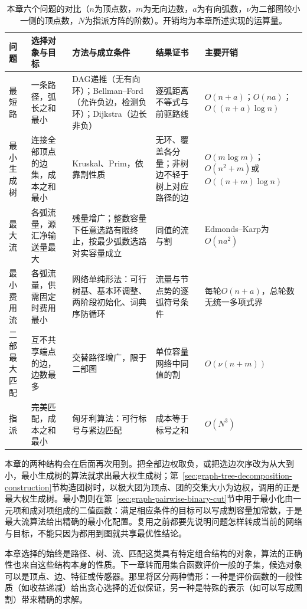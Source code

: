 \begin{table}[!htb]
  \centering\small
  \caption{本章六个问题的对比（$n$为顶点数，$m$为无向边数，$a$为有向弧数，$\nu$为二部图较小一侧的顶点数，$N$为指派方阵的阶数）。开销均为本章所述实现的运算量。}
  \label{tab:graph-opt-summary}
  \begin{tabularx}{\linewidth}{@{}l>{\raggedright\arraybackslash}X>{\raggedright\arraybackslash}X>{\raggedright\arraybackslash}X>{\raggedright\arraybackslash}p{30mm}@{}}
    \toprule
    问题 & 选择对象与目标 & 方法与成立条件 & 结果证书 & 主要开销\\
    \midrule
    最短路 & 一条路径，弧长之和最小 & DAG递推（无有向环）；Bellman--Ford（允许负边，检测负环）；Dijkstra（边长非负） & 逐弧距离不等式与前驱路线 & $O(n+a)$；$O(na)$；$O((n+a)\log n)$\\
    最小生成树 & 连接全部顶点的边集，成本之和最小 & Kruskal、Prim，依靠割性质 & 无环、覆盖各分量；非树边不轻于树上对应路径的边 & $O(m\log m)$；$O(n^2+m)$或$O((n+m)\log n)$\\
    最大流 & 各弧流量，源汇净输送量最大 & 残量增广；整数容量下任意选路有限终止，按最少弧数选路对实容量成立 & 同值的流与割 & Edmonds--Karp为$O(na^2)$\\
    最小费用流 & 各弧流量，供需固定时费用最小 & 网络单纯形法：可行树基、基本环调整、两阶段初始化、词典序防循环 & 流量与节点势的逐弧符号条件 & 每轮$O(n+a)$，总轮数无统一多项式界\\
    二部最大匹配 & 互不共享端点的边，边数最多 & 交替路径增广，限于二部图 & 单位容量网络中同值的割 & $O(\nu(n+m))$\\
    指派 & 完美匹配，成本之和最小 & 匈牙利算法：可行标号与紧边匹配 & 成本等于标号之和 & $O(N^3)$\\
    \bottomrule
  \end{tabularx}
\end{table}

本章的两种结构会在后面再次用到。把全部边权取负，或把选边次序改为从大到小，最小生成树的算法就求出最大权生成树；第~\ref{sec:graph-tree-decomposition-construction}节构造团树时，以极大团为顶点、团的交集大小为边权，调用的正是最大权生成树。最小割则在第~\ref{sec:graph-pairwise-binary-cut}节中用于最小化由一元项和成对项组成的二值函数：满足相应条件的目标可以写成割容量加常数，于是最大流算法给出精确的最小化配置。复用之前都要先说明问题怎样转成当前的网络与目标，不能只因为都用到图就共享最优性结论。

本章选择的始终是路径、树、流、匹配这类具有特定组合结构的对象，算法的正确性也来自这些结构本身的性质。下一章转而用集合函数评价一般的子集，候选对象可以是顶点、边、特征或传感器。那里将区分两种情形：一种是评价函数的一般性质（如收益递减）给出贪心选择的近似保证，另一种是特殊的表示（如可以写成图割）带来精确的求解。
